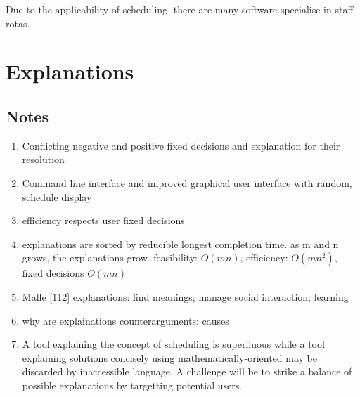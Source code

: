 Due to the applicability of scheduling, there are many software specialise in staff rotas.

\section{Explanations}

\subsection{Notes}
\begin{enumerate}
	\item Conflicting negative and positive fixed decisions and explanation for their resolution
	\item Command line interface and improved graphical user interface with random, schedule display
	\item efficiency respects user fixed decisions
	\item explanations are sorted by reducible longest completion time. as m and n grows, the explanations grow. feasibility: $O(mn)$, efficiency: $O(mn^2)$, fixed decisions $O(mn)$
	\item Malle [112] explanations: find meanings, manage social interaction; learning
	\item why are explainations counterarguments: causes
	\item A tool explaining the concept of scheduling is superfluous while a tool explaining solutions concisely using mathematically-oriented may be discarded by inaccessible language. A challenge will be to strike a balance of possible explanations by targetting potential users.
\end{enumerate}

